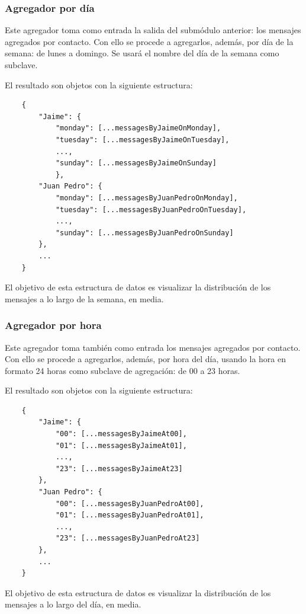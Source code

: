 \subsubsection{Agregador por día}

Este agregador toma como entrada la salida del submódulo anterior: los mensajes agregados por contacto. Con ello se procede a agregarlos, además, por día de la semana: de lunes a domingo. Se usará el nombre del día de la semana como subclave.

El resultado son objetos con la siguiente estructura:

\begin{lstlisting}
	{
		"Jaime": {
			"monday": [...messagesByJaimeOnMonday],
			"tuesday": [...messagesByJaimeOnTuesday],
			...,
			"sunday": [...messagesByJaimeOnSunday]
			},
		"Juan Pedro": {
			"monday": [...messagesByJuanPedroOnMonday],
			"tuesday": [...messagesByJuanPedroOnTuesday],
			...,
			"sunday": [...messagesByJuanPedroOnSunday]
		},
		...
	}
\end{lstlisting}

El objetivo de esta estructura de datos es visualizar la distribución de los mensajes a lo largo de la semana, en media.

\subsubsection{Agregador por hora}

Este agregador toma también como entrada los mensajes agregados por contacto. Con ello se procede a agregarlos, además, por hora del día, usando la hora en formato 24 horas como subclave de agregación: de 00 a 23 horas.

El resultado son objetos con la siguiente estructura:

\begin{lstlisting}
	{
		"Jaime": {
			"00": [...messagesByJaimeAt00],
			"01": [...messagesByJaimeAt01],
			...,
			"23": [...messagesByJaimeAt23]
		},
		"Juan Pedro": {
			"00": [...messagesByJuanPedroAt00],
			"01": [...messagesByJuanPedroAt01],
			...,
			"23": [...messagesByJuanPedroAt23]
		},
		...
	}
\end{lstlisting}

El objetivo de esta estructura de datos es visualizar la distribución de los mensajes a lo largo del día, en media.

